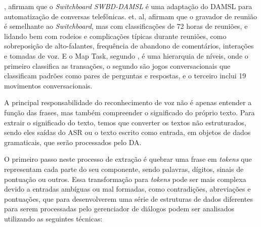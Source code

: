 \documentclass[
	12pt,				%
	oneside,
	a4paper,			%
	english,			%
	french,				%
	spanish,			%
	brazil				%
	]{abntex2}
\begin{document}
\textcite{dasml-switchboard}, afirmam que o \emph{Switchboard SWBD-DAMSL} é uma adaptação do DAMSL para automatização de conversas telefônicas. \textcite{shriberg-etal-2004-icsi} et. al, afirmam que o gravador de reunião é semelhante ao \emph{Switchboard}, mas com classificações de 72 horas de reuniões, e lidando bem com rodeios e complicações típicas durante reuniões, como sobreposição de alto-falantes, frequência de abandono de comentários, interações e tomadas de voz. E o Map Task, segundo \textcite{map-task}, é uma hierarquia de níveis, onde o primeiro classifica as transações, o segundo são jogos conversacionais que classificam padrões como pares de perguntas e respostas, e o terceiro inclui 19 movimentos conversacionais.

A principal responsabilidade do reconhecimento de voz não é apenas entender a função das frases, mas também compreender o significado do próprio texto.
Para extrair o significado do texto, temos que converter os textos não estruturados, sendo eles saídas do ASR ou o texto escrito como entrada, em objetos de dados gramaticais, que serão processados pelo DA. \cite{conversational-interface}

O primeiro passo neste processo de extração é quebrar uma frase em \emph{tokens} que representam cada parte do seu componente, sendo palavras, dígitos, sinais de pontuação ou outros. Essa transformação para \emph{tokens} pode ser mais complexa devido a entradas ambíguas ou mal formadas, como contradições, abreviações e pontuações, que para desenvolverem uma série de estruturas de dados diferentes para serem processadas pelo gerenciador de diálogos podem ser analisados utilizando as seguintes técnicas:
\end{document}
